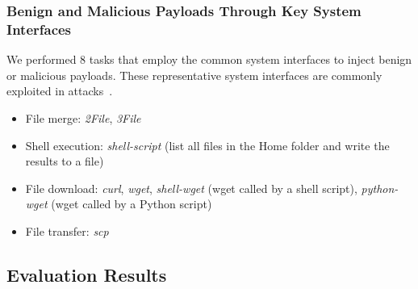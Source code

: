 \subsubsection{Benign and Malicious Payloads Through Key System Interfaces}
\label{subsub:benign-cases}
We performed 8 tasks that employ the common system interfaces to inject benign or malicious payloads. These representative system interfaces are commonly exploited in attacks~\cite{securitybook}.


\begin{itemize}[noitemsep, topsep=1pt, partopsep=1pt, listparindent=\parindent, leftmargin=*]
\item File merge: \emph{2File}, \emph{3File}

\item Shell execution: \emph{shell-script} (list all files in the Home folder and write the results to a file)

\item File download: \emph{curl}, \emph{wget}, \emph{shell-wget} (wget called by a shell script), \emph{python-wget} (wget called by a Python script)

\item File transfer: \emph{scp}
\end{itemize}


% 








\subsection{Evaluation Results}
\label{subsec:eval-results}









